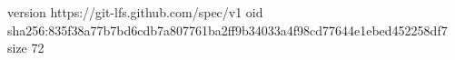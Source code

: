 version https://git-lfs.github.com/spec/v1
oid sha256:835f38a77b7bd6cdb7a807761ba2ff9b34033a4f98cd77644e1ebed452258df7
size 72
